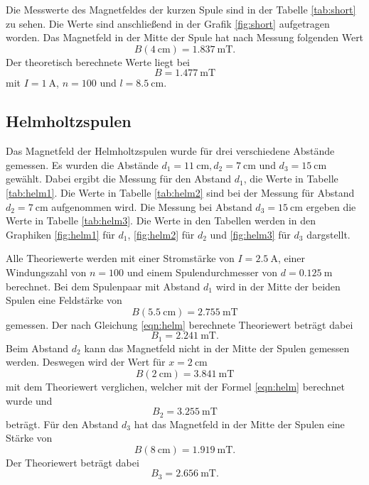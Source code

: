 Die Messwerte des Magnetfeldes der kurzen Spule sind in der Tabelle \ref{tab:short} zu sehen.
Die Werte sind anschließend in der Grafik \ref{fig:short} aufgetragen worden.
Das Magnetfeld in der Mitte der Spule hat nach Messung folgenden Wert
\begin{equation*}
  B(\SI{4}{\centi\meter})=\SI{1.837}{\milli\tesla} .
\end{equation*}
Der theoretisch berechnete Werte liegt bei
\begin{equation*}
  B = \SI{1.477}{\milli\tesla}
\end{equation*}
mit $I=\SI{1}{\ampere}$, $n=100$ und $l=\SI{8.5}{\centi\meter}$.
\FloatBarrier

\subsection{Helmholtzspulen}

Das Magnetfeld der Helmholtzspulen wurde für drei verschiedene Abstände gemessen.
Es wurden die Abstände $d_1=\SI{11}{\centi\metre}, d_2=\SI{7}{\centi\metre}$ und $d_3=\SI{15}{\centi\metre}$ gewählt.
Dabei ergibt die Messung für den Abstand $d_1$, die Werte in Tabelle \ref{tab:helm1}.
Die Werte in Tabelle \ref{tab:helm2} sind bei der Messung für Abstand $d_2=\SI{7}{\centi\metre}$ aufgenommen wird.
Die Messung bei Abstand $d_3=\SI{15}{\centi\metre}$ ergeben die Werte in Tabelle \ref{tab:helm3}.
Die Werte in den Tabellen werden in den Graphiken \ref{fig:helm1} für $d_1$, \ref{fig:helm2} für $d_2$ und \ref{fig:helm3} für $d_3$ dargstellt.

Alle Theoriewerte werden mit einer Stromstärke von $I=\SI{2.5}{\ampere}$, einer Windungszahl von $n=100$ und einem Spulendurchmesser von $d=\SI{0.125}{\meter}$ berechnet.
Bei dem Spulenpaar mit Abstand $d_1$ wird in der Mitte der beiden Spulen eine Feldstärke von 
\begin{equation*}
  B(\SI{5.5}{\centi\meter}) =\SI{2.755}{\milli\tesla}
\end{equation*}
gemessen.
Der nach Gleichung \eqref{eqn:helm} berechnete Theoriewert beträgt dabei
\begin{equation*}
  B_1=\SI{2.241}{\milli\tesla} .
\end{equation*}
Beim Abstand $d_2$ kann das Magnetfeld nicht in der Mitte der Spulen gemessen werden.
Deswegen wird der Wert für $x=\SI{2}{\centi\meter}$
\begin{equation*}
  B(\SI{2}{\centi\meter})=\SI{3.841}{\milli\tesla}
\end{equation*}
mit dem Theoriewert verglichen, welcher mit der Formel \eqref{eqn:helm} berechnet wurde und 
\begin{equation*}
  B_2 =\SI{3.255}{\milli\tesla}
\end{equation*}
beträgt.
Für den Abstand $d_3$ hat das Magnetfeld in der Mitte der Spulen eine Stärke von 
\begin{equation*}
  B(\SI{8}{\centi\meter})=\SI{1.919}{\milli\tesla} .
\end{equation*}
Der Theoriewert beträgt dabei 
\begin{equation*}
  B_3=\SI{2.656}{\milli\tesla}.
\end{equation*}

